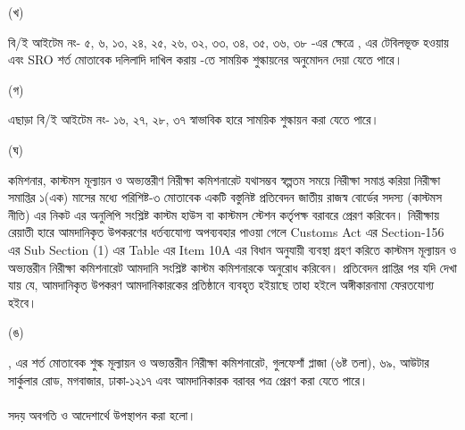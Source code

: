 \documentclass[12pt]{article}
\begin{document}
\begin{minipage}[t]{0.05\linewidth}
(খ)
\end{minipage}
\begin{minipage}[t]{0.90\linewidth}
বি/ই আইটেম নং-
৫, ৬, ১৩, ২৪, ২৫, ২৬,
৩২, ৩৩, ৩৪, ৩৫, ৩৬, ৩৮
-এর ক্ষেত্রে
{\srooot}, {\sroootd}
এর টেবিলভূক্ত হওয়ায়
এবং SRO শর্ত মোতাবেক
দলিলাদি দাখিল করায়
{\cpcttz}
-তে
সাময়িক
শুল্কায়নের অনুমোদন দেয়া
যেতে পারে।
\\
\end{minipage}
\begin{minipage}[t]{0.05\linewidth}
\hspace{1em}
\end{minipage}
\begin{minipage}[t]{0.05\linewidth}
(গ)
\end{minipage}
\begin{minipage}[t]{0.90\linewidth}
এছাড়া বি/ই আইটেম নং-
১৬, ২৭, ২৮, ৩৭
স্বাভাবিক হারে
সাময়িক
শুল্কায়ন করা
যেতে পারে।
\\
\end{minipage}
\begin{minipage}[t]{0.05\linewidth}
\hspace{1em}
\end{minipage}
\begin{minipage}[t]{0.05\linewidth}
(ঘ)
\end{minipage}
\begin{minipage}[t]{0.90\linewidth}
কমিশনার, কাস্টমস মূল্যায়ন ও অভ্যন্তরীণ
নিরীক্ষা কমিশনারেট যথাসম্ভব স্বল্পতম সময়ে
নিরীক্ষা সমাপ্ত করিয়া নিরীক্ষা সমাপ্তির
১(এক) মাসের মধ্যে পরিশিষ্ট-৩ মোতাবেক একটি
বস্তুনিষ্ট প্রতিবেদন জাতীয় রাজস্ব বোর্ডের
সদস্য (কাস্টমস নীতি) এর নিকট এর অনুলিপি সংশ্লিষ্ট
কাস্টম হাউস বা কাস্টমস স্টেশন কর্তৃপক্ষ
বরাবরে প্রেরণ করিবেন।
নিরীক্ষায় রেয়াতী হারে আমদানিকৃত উপকরণের
ধর্তব্যযোগ্য অপব্যবহার পাওয়া গেলে
Customs Act এর Section-156
এর Sub Section (1) এর Table এর Item 10A
এর বিধান অনুযায়ী ব্যবস্থা গ্রহণ করিতে কাস্টমস
মূল্যায়ন ও অভ্যন্তরীন নিরীক্ষা কমিশনারেট আমদানি
সংশ্লিষ্ট কাস্টম কমিশনারকে অনুরোধ করিবেন।
প্রতিবেদন প্রাপ্তির পর যদি দেখা যায় যে, আমদানিকৃত
উপকরণ আমদানিকারকের প্রতিষ্ঠানে ব্যবহৃত হইয়াছে তাহা
হইলে অঙ্গীকারনামা ফেরতযোগ্য হইবে।
\\
\end{minipage}
\begin{minipage}[t]{0.05\linewidth}
\hspace{1em}
\end{minipage}
\begin{minipage}[t]{0.05\linewidth}
(ঙ)
\end{minipage}
\begin{minipage}[t]{0.90\linewidth}
{\srootz}, {\srootzd} এর শর্ত মোতাবেক
শুল্ক মূল্যায়ন ও অভ্যন্তরীন নিরীক্ষা কমিশনারেট,
গুলফেশাঁ প্লাজা (৬ষ্ট তলা), ৬৯, আউটার
সার্কুলার রোড, মগবাজার, ঢাকা-১২১৭ এবং
আমদানিকারক বরাবর পত্র প্রেরণ করা যেতে পারে।
\\
\\
সদয় অবগতি ও আদেশার্থে উপস্থাপন করা
হলো।
\end{minipage}
\end{document}
